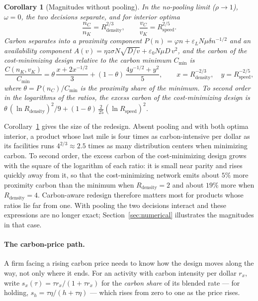 \documentclass[11pt]{article}
\newtheorem{corollary}[proposition]{Corollary}
\theoremstyle{definition}
\theoremstyle{remark}
\theoremstyle{plain}
\begin{document}
\begin{corollary}[Magnitudes without pooling]\label{cor:nopool}
In the no-pooling limit ($\rho\to1$), $\omega=0$, the two decisions separate, and for interior optima
\[
  \frac{n_C}{n_K}=R_{\mathrm{density}}^{2/3},\qquad \frac{v_C}{v_K}=R_{\mathrm{speed}}^{2/5}.
\]
Carbon separates into a proximity component $P(n)=\varphi n+\varepsilon_LN\mu\delta n^{-1/2}$ and an
availability component $A(v)=\eta z\sigma N\sqrt{D/v}+\varepsilon_0N\mu D\,v^2$, and the carbon of the
cost-minimizing design relative to the carbon minimum $C_{\min}$ is
\begin{equation}\label{eq:excess}
  \frac{C(n_K,v_K)}{C_{\min}}=\theta\,\frac{x+2x^{-1/2}}{3}+(1-\theta)\,\frac{4y^{-1/2}+y^2}{5},
  \qquad x=R_{\mathrm{density}}^{-2/3},\quad y=R_{\mathrm{speed}}^{-2/5},
\end{equation}
where $\theta=P(n_C)/C_{\min}$ is the proximity share of the minimum. To second order in the logarithms of the
ratios, the excess carbon of the cost-minimizing design is
$\theta\,(\ln R_{\mathrm{density}})^2/9+(1-\theta)\,\tfrac{2}{25}(\ln R_{\mathrm{speed}})^2$.
\end{corollary}

\noindent Corollary~\ref{cor:nopool} gives the size of the redesign. Absent pooling and with both optima
interior, a product whose last mile is four times as carbon-intensive per dollar as its facilities runs
$4^{2/3}\approx2.5$ times as many distribution centers when minimizing carbon. To second order, the excess
carbon of the cost-minimizing design grows with the square of the logarithm of each ratio: it is small near
parity and rises quickly away from it, so that the cost-minimizing network
emits about $5\%$ more proximity carbon than the minimum when $R_{\mathrm{density}}=2$ and about $19\%$ more
when $R_{\mathrm{density}}=4$. Carbon-aware redesign therefore matters most for products whose ratios lie far
from one. With pooling the two decisions interact and these expressions are no longer exact;
Section~\ref{sec:numerical} illustrates the magnitudes in that case.

\paragraph{The carbon-price path.} A firm facing a rising carbon price needs to know how the design moves along
the way, not only where it ends. For an activity with carbon intensity per dollar $r_x$, write
$s_x(\tau)=\tau r_x/(1+\tau r_x)$ for the \emph{carbon share} of its blended rate --- for holding,
$s_h=\tau\eta/(h+\tau\eta)$ --- which rises from zero to one as the price rises.
\end{document}
